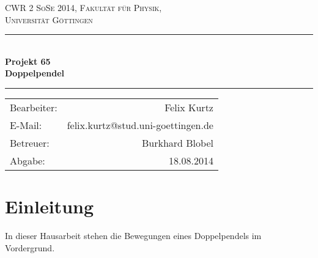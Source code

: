 \documentclass[12pt,a4paper,titlepage,headinclude,bibtotoc]{scrartcl}
\begin{document}
\begin{titlepage}
\centering
\textsc{\Large CWR 2 SoSe 2014, Fakultät für
  Physik,\\[1.5ex] Universität Göttingen}

\vspace*{4.2cm}

\rule{\textwidth}{1pt}\\[0.5cm]
{\huge \bfseries
  Projekt 65\\[1.5ex]
  Doppelpendel}\\[0.5cm]
\rule{\textwidth}{1pt}

\vspace*{3.0cm}

\begin{Large}
\begin{tabular}{lr}
 Bearbeiter:  &  Felix Kurtz\\
 E-Mail: &  felix.kurtz@stud.uni-goettingen.de\\
 Betreuer: & Burkhard Blobel \\
 Abgabe: & 18.08.2014\\
\end{tabular}
\end{Large}

\vspace*{0.8cm}
\begin{Large}
\end{Large}

\end{titlepage}

\tableofcontents

\newpage

\section{Einleitung}
\label{sec:einleitung}
In dieser Hausarbeit stehen die Bewegungen eines Doppelpendels im Vordergrund.\\
\end{document}
